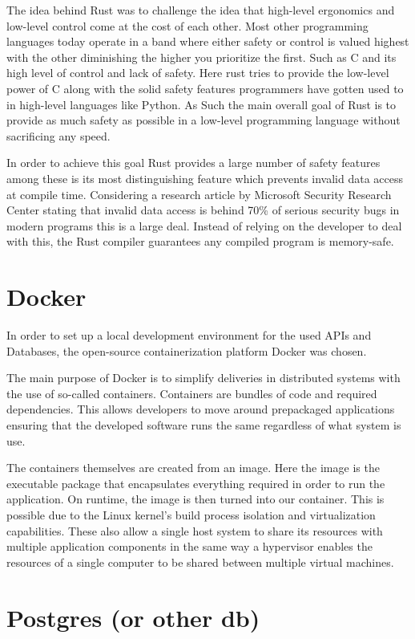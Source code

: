The idea behind Rust was to challenge the idea that high-level ergonomics and low-level control come at the cost of each other\cite{Rust_Book}.
Most other programming languages today operate in a band where either safety or control is valued highest with the other diminishing the higher you prioritize the first. Such as C and its high level of control and lack of safety. 
Here rust tries to provide the low-level power of C along with the solid safety features programmers have gotten used to in high-level languages like Python. 
As Such the main overall goal of Rust is to provide as much safety as possible in a low-level programming language without sacrificing any speed\cite{Rust_in_Action}.

In order to achieve this goal Rust provides a large number of safety features among these is its most distinguishing feature which prevents invalid data access at compile time. 
Considering a research article by Microsoft Security Research Center stating that invalid data access is behind 70\% of serious security bugs in modern programs this is a large deal\cite{Safe_Systems_Languages}. 
Instead of relying on the developer to deal with this, the Rust compiler guarantees any compiled program is memory-safe.


\section{Docker}
In order to set up a local development environment for the used APIs and Databases, the open-source containerization platform Docker was chosen. 

The main purpose of Docker is to simplify deliveries in distributed systems with the use of so-called containers\cite{Docker_Container}.
Containers are bundles of code and required dependencies. This allows developers to move around prepackaged applications ensuring that the developed software runs the same regardless of what system is use\cite{Docker_Container}.

The containers themselves are created from an image. Here the image is the executable package that encapsulates everything required in order to run the application. On runtime, the image is then turned into our container. 
This is possible due to the Linux kernel's build process isolation and virtualization capabilities. These also allow a single host system to share its resources with multiple application components in the same way a hypervisor enables the resources of a single computer to be shared between multiple virtual machines\cite{Docker_Container}.


\section{Postgres (or other db)} %

